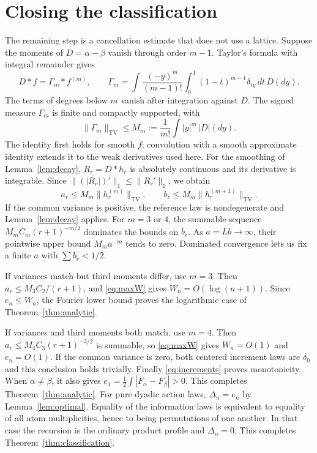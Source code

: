 \documentclass[11pt,a4paper]{article}
\numberwithin{equation}{section}
\newcommand{\TV}{\mathrm{TV}}
\begin{document}
\section{Closing the classification}\label{sec:closing}
The remaining step is a cancellation estimate that does not use a
lattice. Suppose the moments of $D=\alpha-\beta$ vanish through order
$m-1$. Taylor's formula with integral remainder gives
\begin{equation}\label{eq:factor}
D*f=\Gamma_m*f^{(m)},\qquad
\Gamma_m=\int \frac{(-y)^m}{(m-1)!}
                 \int_0^1(1-t)^{m-1}\delta_{ty}\,dt\,D(dy).
\end{equation}
The terms of degrees below $m$ vanish after integration against $D$.
The signed measure $\Gamma_m$ is finite and compactly supported, with
\[
\|\Gamma_m\|_{\TV}\le M_m:=\frac1{m!}\int |y|^m\,|D|(dy).
\]
The identity first holds for smooth $f$; convolution with a smooth
approximate identity extends it to the weak derivatives used here.
For the smoothing of Lemma~\ref{lem:decay}, $R_r=D*h_r$ is absolutely
continuous and its derivative is integrable. Since
$\|(|R_r|)'\|_1\le\|R_r'\|_1$, we obtain
\begin{equation}\label{eq:ab}
a_r\le M_m\|h_r^{(m)}\|_{\TV},\qquad
b_r\le M_m\|h_r^{(m+1)}\|_{\TV}.
\end{equation}
If the common variance is positive, the reference law is nondegenerate and
Lemma~\ref{lem:decay} applies.
For $m=3$ or $4$, the summable sequence
$M_mC_m(r+1)^{-m/2}$ dominates the bounds on $b_r$.
As $a=Lb\to\infty$, their pointwise upper bound $M_ma^{-m}$ tends to
zero. Dominated convergence lets us fix a finite $a$ with
$\sum b_r<1/2$.

If variances match but third moments differ, use $m=3$.
Then $a_r\le M_3C_2/(r+1)$, and \eqref{eq:maxW} gives
$W_n=O(\log(n+1))$. Since $e_n\le W_n$, the Fourier lower bound proves the logarithmic case
of Theorem~\ref{thm:analytic}.

If variances and third moments both match, use $m=4$.
Then $a_r\le M_4C_3(r+1)^{-3/2}$ is summable, so
\eqref{eq:maxW} gives $W_n=O(1)$ and $e_n=O(1)$.
If the common variance is zero, both centered increment laws are $\delta_0$ and this conclusion holds trivially.
Finally \eqref{eq:increments} proves monotonicity. When
$\alpha\ne\beta$, it also gives
$e_1=\tfrac12\int|F_\alpha-F_\beta|>0$.
This completes Theorem~\ref{thm:analytic}.
For pure dyadic action laws, $\Delta_n=e_n$ by Lemma~\ref{lem:optimal}.
Equality of the information laws is equivalent to
equality of all atom multiplicities, hence to being permutations of one
another. In that case the recursion is the ordinary product profile and
$\Delta_n=0$. This completes Theorem~\ref{thm:classification}.
\end{document}
